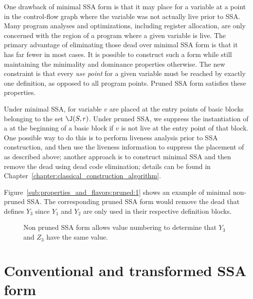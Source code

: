 One drawback of minimal SSA form is that it may place \phifuns for a variable at a point in the control-flow graph where the variable was not actually live prior to SSA. 
Many program analyses and optimizations, including register allocation, are only concerned with the region of a program where a given variable is live. 
The primary advantage of eliminating those dead \phifuns over minimal SSA form is that it has far fewer \phifuns in most cases. 
It is possible to construct such a form while still maintaining the minimality and dominance properties otherwise. 
The new constraint is that every \emph{use point} for a given variable must be reached by exactly one definition, as opposed to all program points. 
Pruned SSA form satisfies these properties.

Under minimal SSA, \phifuns for variable $v$ are placed at the entry points of basic blocks belonging to the set $\J(S,r)$. 
Under pruned SSA, we suppress the instantiation of a \phifun at the beginning of a basic block if $v$ is not live at the entry point of that block. 
One possible way to do this is to perform liveness analysis prior to SSA construction, and then use the liveness information to suppress the placement of \phifuns as described above; 
another approach is to construct minimal SSA and then remove the dead \phifuns using dead code elimination; 
details can be found in Chapter~\ref{chapter:classical_construction_algorithm}.

Figure~\ref{sub:properties_and_flavors:pruned:1} shows an example of minimal non-pruned SSA. 
The corresponding pruned SSA form would remove the dead \phifun that defines $Y_3$ since $Y_1$ and $Y_2$ are only used in their respective definition blocks.

\begin{figure}
\begin{center}
\caption{Non pruned SSA form allows value numbering to determine that $Y_3$ and $Z_3$ have the same value.}
\label{fig:properties_and_flavors:pruned}
\end{center}
\end{figure}




\section{Conventional and transformed SSA form}
\label{sec-prop-conventional}

